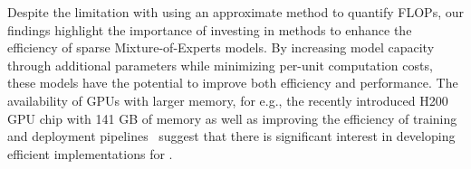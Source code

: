 Despite the limitation with using an approximate method to quantify FLOPs, our findings highlight the importance of investing in methods to enhance the efficiency of sparse Mixture-of-Experts models. By increasing model capacity through additional parameters while minimizing per-unit computation costs, these models have the potential to improve both efficiency and performance. The availability of GPUs with larger memory, for e.g., the recently introduced H200 GPU chip with 141 GB of memory as well as improving the efficiency of training and deployment pipelines~\citep{nv_nemo} suggest that there is significant interest in developing efficient implementations for \moes.






